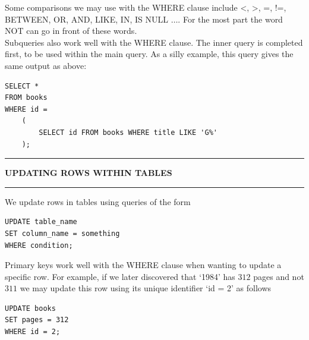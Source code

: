 \documentclass[8pt]{extarticle}
\newcommand{\heading}[1]{%
    \noindent
    \rule{\linewidth}{0.4pt}
    \begin{center}
        \vspace{-1ex}
        \textbf{#1}        
        \vspace{-2.5ex}
    \end{center}
    \rule{\linewidth}{0.4pt}
}
\begin{document}
\begin{multicols}{4}
Some comparisons we may use with the WHERE clause include <, >, =, !=, BETWEEN, OR, AND, LIKE, IN, IS NULL $\ldots$. For the most part the word NOT can go in front of these words.\\

Subqueries also work well with the WHERE clause. The inner query is completed first, to be used within the main query. As a silly example, this query gives the same output as above:

\vspace{0.5ex}
\begin{lstlisting}[style=sql]
SELECT *
FROM books
WHERE id =
    (
        SELECT id FROM books WHERE title LIKE 'G%'
    );
\end{lstlisting}
\vspace{0.5ex}

\vspace{1ex}

\heading{UPDATING ROWS WITHIN TABLES}

We update rows in tables using queries of the form 

\vspace{0.5ex}
\begin{lstlisting}[style=sql]
UPDATE table_name
SET column_name = something 
WHERE condition;
\end{lstlisting}
\vspace{0.5ex}

Primary keys work well with the WHERE clause when wanting to update a specific row. For example, if we later discovered that `1984' has $312$ pages and not $311$ we may update this row using its unique identifier `id = 2' as follows

\vspace{0.5ex}
\begin{lstlisting}[style=sql]
UPDATE books 
SET pages = 312 
WHERE id = 2;
\end{lstlisting}
\vspace{0.5ex}

\vspace{1ex}

\end{multicols}

\newpage
\thispagestyle{empty} 
\end{document}
